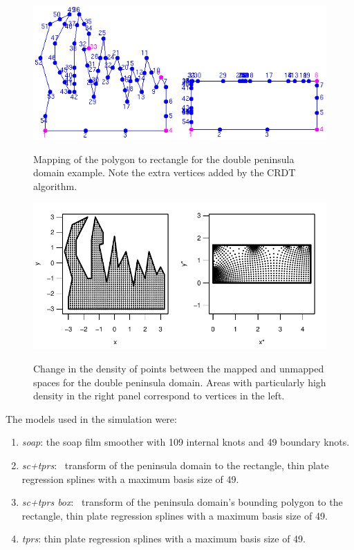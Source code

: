 \begin{figure}
\centering
\includegraphics{sc/figs/wigglytop2-numbered.png} \\
\caption{Mapping of the polygon to rectangle for the double peninsula domain example. Note the extra vertices added by the CRDT algorithm.}
\label{wigglytop2-numbered}
\end{figure}

\begin{figure}
\centering
\includegraphics[width=6in]{sc/figs/wt2-points.pdf} \\
\caption{Change in the density of points between the mapped and unmapped spaces for the double peninsula domain. Areas with particularly high density in the right panel correspond to vertices in the left.}
\label{wt2-points}
\end{figure}

The models used in the simulation were:
\begin{enumerate}
\item \textit{soap}: the soap film smoother with 109 internal knots and 49 boundary knots.
\item \textit{sc+tprs}: \sch\ transform of the peninsula domain to the rectangle, thin plate regression splines with a maximum basis size of 49.
\item \textit{sc+tprs box}: \sch\ transform of the peninsula domain's bounding polygon to the rectangle, thin plate regression splines with a maximum basis size of 49.
\item \textit{tprs}: thin plate regression splines with a maximum basis size of 49.
\end{enumerate}

